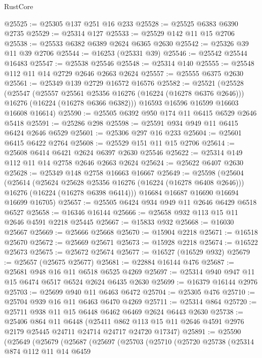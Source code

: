 \begin{lexlean}{RustCore}
\begin{coremodule}
@25525 := @25305 @137 @251 @16 @233
@25528 := @25525 @6383 @6390 @2735
@25529 := @25314 @127
@25533 := @25529 @142 @11 @15 @2706
@25538 := @25533 @6382 @6389 @2624 @6365 @2630
@25542 := @25326 @39 @11 @39 @2706
@25544 := @16253 (@25331 @39)
@25546 := @25542 @25544 @16483
@25547 := @25538 @25546
@25548 := @25314 @140
@25555 := @25548 @112 @11 @14 @2729 @2646 @2663 @2624
@25557 := @25555 @6375 @2630
@25561 := @25349 @139 @2729 @16572 @16576
@25582 := @25521
    (@25528
      (@25547
        (@25557 @25561 @25356 @16276 (@16224 (@16278 @6376 @2646)))
        @16276
        (@16224 (@16278 @6366 @6382)))
      @16593
      @16596
      @16599
      @16603
      @16608
      @16614)
@25590 := @25505 @6392 @950 @174 @11 @6415 @6529 @2646 @5418
@25591 := @25286 @298
@25598 := @25591 @934 @949 @11 @6415 @6424 @2646 @6529
@25601 := @25306 @297 @16 @233
@25604 := @25601 @6415 @6422 @2764
@25608 := @25529 @151 @11 @15 @2706
@25614 := @25608 @6414 @6421 @2624 @6397 @2630 @25546
@25622 := @25314 @149 @112 @11 @14 @2758 @2646 @2663 @2624
@25624 := @25622 @6407 @2630
@25628 := @25349 @148 @2758 @16663 @16667
@25649 := @25598
    (@25604
      (@25614
        (@25624 @25628 @25356 @16276 (@16224 (@16278 @6408 @2646)))
        @16276
        (@16224 (@16278 @6398 @6414)))
      @16684
      @16687
      @16690
      @16694
      @16699
      @16705)
@25657 := @25505 @6424 @934 @949 @11 @2646 @6429 @6518 @6527
@25658 := @16346 @16144
@25666 := @25658 @932 @113 @15 @11 @2646 @4591 @2218 @25445
@25667 := @15833 @932
@25668 := @16030 @25667
@25669 := @25666 @25668
@25670 := @15904 @2218
@25671 := @16518 @25670
@25672 := @25669 @25671
@25673 := @15928 @2218
@25674 := @16522 @25673
@25675 := @25672 @25674
@25677 := @16527 (@16529 @932)
@25679 := @25657 (@25675 @25677)
@25681 := @22884 @16144 @476
@25687 := @25681 @948 @16 @11 @6518 @6525 @4269
@25697 := @25314 @940 @947 @11 @15 @6474 @6517 @6524 @2624 @6435 @2630
@25699 := @16379 @16144 @2976
@25703 := @25699 @940 @11 @6463 @6472
@25704 := @25305 @476
@25710 := @25704 @939 @16 @11 @6463 @6470 @4269
@25711 := @25314 @864
@25720 := @25711 @938 @11 @15 @6448 @6462 @6469 @2624 @6443 @2630
@25738 := @25406
    @864
    @11
    @6448
    (@25411 @862 @113 @15 @11 @2646 @4591 @2976 @2179 @25445 @24711 @24714 @24717 @24720 @17347)
@25891 := @25590
    (@25649
      (@25679
        (@25687
          (@25697
            (@25703
              (@25710
                (@25720
                  @25738
                  (@25314
                    @874
                    @112
                    @11
                    @14
                    @6459

\end{coremodule}
\end{lexlean}
